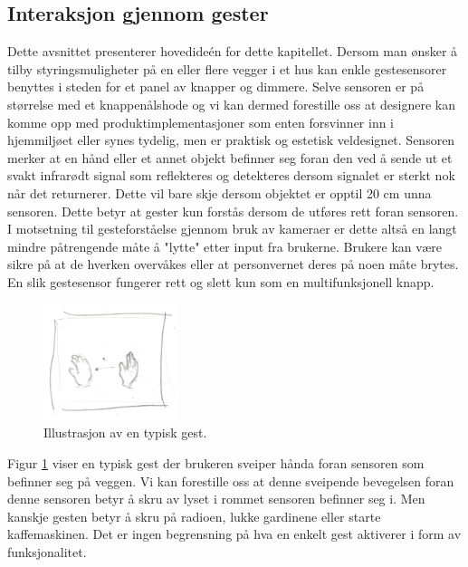 \subsection{Interaksjon gjennom gester}
\label{ch:2.minide}
Dette avsnittet presenterer hovedideén for dette kapitellet. 
Dersom man ønsker å tilby styringsmuligheter på en eller flere vegger i et hus kan enkle gestesensorer benyttes i steden for et panel av knapper og dimmere. Selve sensoren er på størrelse med et knappenålshode og vi kan dermed forestille oss at designere kan komme opp med produktimplementasjoner som enten forsvinner inn i hjemmiljøet eller synes tydelig, men er praktisk og estetisk veldesignet. Sensoren merker at en hånd eller et annet objekt befinner seg foran den ved å sende ut et svakt infrarødt signal som reflekteres og detekteres dersom signalet er sterkt nok når det returnerer. Dette vil bare skje dersom objektet er opptil 20 cm unna sensoren. Dette betyr at gester kun forstås dersom de utføres rett foran sensoren. I motsetning til gesteforståelse gjennom bruk av kameraer er dette altså en langt mindre påtrengende måte å "lytte" etter input fra brukerne. Brukere kan være sikre på at de hverken overvåkes eller at personvernet deres på noen måte brytes. En slik gestesensor fungerer rett og slett kun som en multifunksjonell knapp.

\begin{figure}
    \vspace{-20pt}
  \begin{center}
    \includegraphics[width=0.35\textwidth]{fig/swipe-l-r}
  \end{center}
  \vspace{-20pt}
  \caption{Illustrasjon av en typisk gest.}
  \label{fig:gest}
  \vspace{-7pt}
\end{figure}

Figur \ref{fig:gest} viser en typisk gest der brukeren sveiper hånda foran sensoren som befinner seg på veggen. Vi kan forestille oss at denne sveipende bevegelsen foran denne sensoren betyr å skru av lyset i rommet sensoren befinner seg i. Men kanskje gesten betyr å skru på radioen, lukke gardinene eller starte kaffemaskinen. Det er ingen begrensning på hva en enkelt gest aktiverer i form av funksjonalitet.

